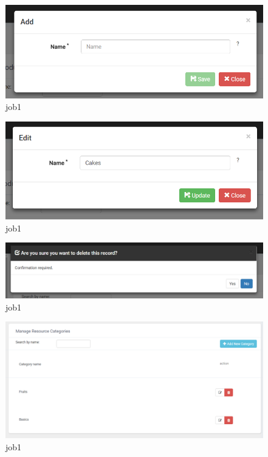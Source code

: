 \documentclass[a4paper,11pt,twoside]{report}
\theoremstyle{definition}
\begin{document}
\begin{figure}[h!]
\begin{center}
\includegraphics[width=\textwidth]{AS/categories/product/2}
\end{center}
\caption{job1}
\end{figure}

\begin{figure}[h!]
\begin{center}
\includegraphics[width=\textwidth]{AS/categories/product/3}
\end{center}
\caption{job1}
\end{figure}

\begin{figure}[h!]
\begin{center}
\includegraphics[width=\textwidth]{AS/categories/product/4}
\end{center}
\caption{job1}
\end{figure}


\begin{figure}[h!]
\begin{center}
\includegraphics[width=\textwidth]{AS/categories/resource/1}
\end{center}
\caption{job1}
\end{figure}
\end{document}
